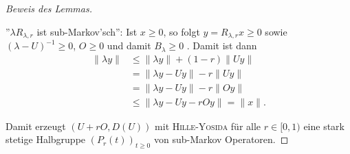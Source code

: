 \documentclass[a4paper]{paper}
\numberwithin{equation}{satz}
\begin{document}
\begin{proof}[Beweis des Lemmas]
\begin{compactenum}
  \item ''$\lambda R_{\lambda,r}$ ist sub-Markov'sch'':
  Ist $x\geq0$, so folgt $y=R_{\lambda,r}x\geq0$ sowie $(\lambda-U)^{-1}\geq0$, $O\geq0$ und damit $B_\lambda\geq0$ . Damit ist dann 
  \begin{align*}
  \|\lambda y\|&\leq\|\lambda y\|+(1-r)\|Uy\|\\
  &=\|\lambda y-Uy\| - r\|Uy\|\\
  &= \|\lambda y-Uy\|-r\|Oy\|\\
  &\leq\|\lambda y-Uy-rOy\|=\|x\|.\end{align*}
  \end{compactenum} 
  Damit erzeugt $(U+rO, D(U))$ mit \textsc{Hille-Yosida} für alle $r\in[0,1)$ eine stark stetige Halbgruppe $(P_r(t))_{t\geq0}$ von sub-Markov Operatoren. 
\end{proof}
\end{document}

